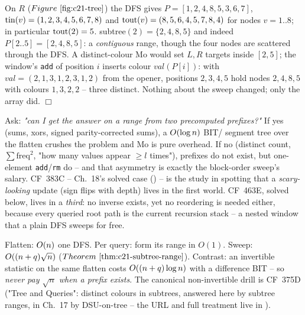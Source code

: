 \begin{tracebox}
On \(R\) (\(\figref{c21-tree}\)) the DFS gives \(P=[1,2,4,8,5,3,6,7]\),
\(\operatorname{tin}(v)=(1,2,3,4,5,6,7,8)\) and \(\operatorname{tout}(v)=(8,5,6,4,5,7,8,4)\) for nodes
\(v=1..8\); in particular \(\operatorname{tout}(2)=5\).  subtree\((2)=\{2,4,8,5\}\) and indeed
\(P[2..5]=[2,4,8,5]\): a \emph{contiguous} range, though the four nodes are
scattered through the DFS.  A distinct-colour Mo would set
\(L,R\) targets inside \([2,5]\); the window's \texttt{add} of position \(i\)
inserts colour \(\mathit{val}(P[i])\): with \(\mathit{val}=(2,1,3,1,2,3,1,2)\)
from the opener, positions \(2,3,4,5\) hold nodes \(2,4,8,5\) with colours
\(1,3,2,2\) -- three distinct.  Nothing about the sweep changed; only the array
did. \(\Box\)
\end{tracebox}

\begin{insightbox}
Ask: \emph{"can I get the answer on a range from two precomputed prefixes?"}
If yes (sums, xors, signed parity-corrected sums), a \(O(\log n)\) BIT/
segment tree over the flatten crushes the problem and Mo is pure overhead.  If
no (distinct count, \(\sum \mathrm{freq}^2\), "how many values appear \(\ge l\)
times"), prefixes do not exist, but one-element \texttt{add}/\texttt{rm} do --
and that asymmetry is exactly the block-order sweep's salary.  CF~383C --
Ch.~18's solved case () -- is the study in spotting that a
\emph{scary-looking} update (sign flips with depth) lives in the first world.
CF~463E, solved below, lives in a \emph{third}: no inverse exists, yet no
reordering is needed either, because every queried root path is the current
recursion stack -- a nested window that a plain DFS sweeps for free.
\end{insightbox}

\begin{complexitybox}[Subtree Mo]
Flatten: \(O(n)\) one DFS.  Per query: form its range in \(O(1)\).  Sweep:
\(O((n+q)\sqrt n)\) (\(\thmref{c21-subtree-range}\)).  Contrast: an
invertible statistic on the same flatten costs \(O((n+q)\log n)\) with a
difference BIT -- so \emph{never pay \(\sqrt n\) when a prefix exists}.  The
canonical non-invertible drill is CF~375D ("Tree and Queries": distinct colours
in subtrees, answered here by subtree ranges, in Ch.~17 by DSU-on-tree -- the
URL and full treatment live in ).
\end{complexitybox}

